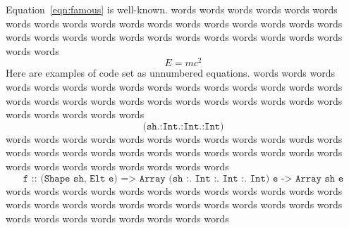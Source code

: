 Equation~\ref{eqn:famous} is well-known.
words words words words words words words words 
words words words words words words words words 
words words words words words words words words 
words words words words words words words words 
%
\begin{equation}
E = mc^2 \label{eqn:famous}
\end{equation}
%
Here are examples of code set as unnumbered equations.
words words words words words words words words 
words words words words words words words words 
words words words words words words words words 
words words words words words words words words 
%
\[ \texttt{(sh.:Int.:Int.:Int)} \]
%
words words words words words words words words 
words words words words words words words words 
words words words words words words words words 
words words words words words words words words 
%
\[ \texttt{f :: (Shape sh, Elt e) => Array (sh :. Int :. Int :. Int) e -> Array sh e} \]
%
words words words words words words words words 
words words words words words words words words 
words words words words words words words words 
words words words words words words words words 
